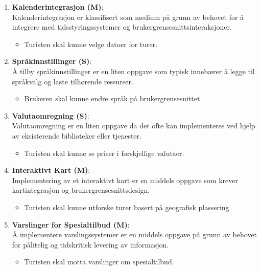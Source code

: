 \documentclass[../doc.tex]{subfiles}
\begin{document}
\begin{enumerate}
    \item \textbf{Kalenderintegrasjon (M)}: \\
    Kalenderintegrasjon er klassifisert som medium på grunn av behovet for å integrere med tidsstyringssystemer og brukergrensesnittsinteraksjoner.
    \begin{itemize}
        \item Turisten skal kunne velge datoer for turer.
    \end{itemize}

    \item \textbf{Språkinnstillinger (S)}: \\
    Å tilby språkinnstillinger er en liten oppgave som typisk innebærer å legge til språkvalg og laste tilhørende ressurser.
    \begin{itemize}
        \item Brukeren skal kunne endre språk på brukergrensesnittet.
    \end{itemize}

    \item \textbf{Valutaomregning (S)}: \\
    Valutaomregning er en liten oppgave da det ofte kan implementeres ved hjelp av eksisterende biblioteker eller tjenester.
    \begin{itemize}
        \item Turisten skal kunne se priser i forskjellige valutaer.
    \end{itemize}

    \item \textbf{Interaktivt Kart (M)}: \\
    Implementering av et interaktivt kart er en middels oppgave som krever kartintegrasjon og brukergrensesnittsdesign.
    \begin{itemize}
        \item Turisten skal kunne utforske turer basert på geografisk plassering.
    \end{itemize}

    \item \textbf{Varslinger for Spesialtilbud (M)}: \\
    Å implementere varslingssystemer er en middels oppgave på grunn av behovet for pålitelig og tidskritisk levering av informasjon.
    \begin{itemize}
        \item Turisten skal motta varslinger om spesialtilbud.
    \end{itemize}


\end{enumerate}
\end{document}
